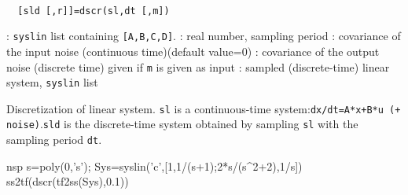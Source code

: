 \begin{mandesc}
   \\ %
\end{mandesc}
\begin{calling_sequence}
\begin{verbatim}
  [sld [,r]]=dscr(sl,dt [,m])  
\end{verbatim}
\end{calling_sequence}
\begin{parameters}
  \begin{varlist}
    : \verb!syslin! list containing \verb![A,B,C,D]!.
    : real number, sampling period
    : covariance of the input noise (continuous time)(default value=0)
    : covariance of the output noise (discrete time) given if \verb!m! is  given as input
    : sampled (discrete-time) linear system, \verb!syslin! list
  \end{varlist}
\end{parameters}
\begin{mandescription}
  Discretization of linear system. \verb!sl! is a continuous-time system:\verb!dx/dt=A*x+B*u (+ noise)!.\verb!sld! is the discrete-time system obtained by 
  sampling \verb!sl! with the sampling period \verb!dt!.
\end{mandescription}
\begin{examples}
  \begin{mintednsp}{nsp}
    s=poly(0,'s');
    Sys=syslin('c',[1,1/(s+1);2*s/(s^2+2),1/s])
    ss2tf(dscr(tf2ss(Sys),0.1))
  \end{mintednsp}
\end{examples}
\begin{manseealso}
      
\end{manseealso}
